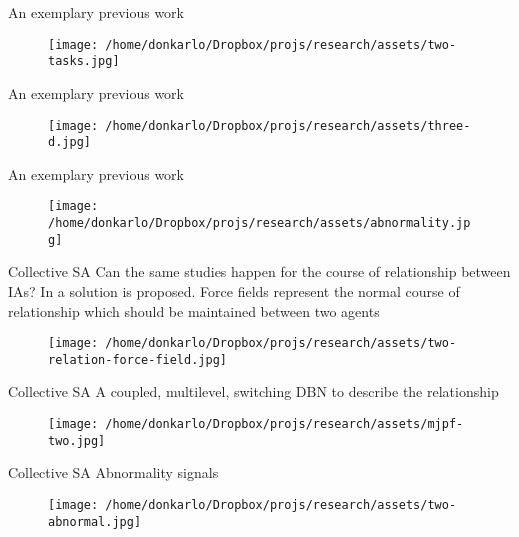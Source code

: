 \documentclass[unknownkeysallowed]{beamer}
\begin{document}
\begin{frame}{An exemplary previous work}
	\begin{figure}
		\texttt{[image: /home/donkarlo/Dropbox/projs/research/assets/two-tasks.jpg]}
		\caption{}
	\end{figure}
\end{frame}

\begin{frame}{An exemplary previous work}
	\begin{figure}
		\texttt{[image: /home/donkarlo/Dropbox/projs/research/assets/three-d.jpg]}
		\caption{}
	\end{figure}
\end{frame}

\begin{frame}{An exemplary previous work}
	\begin{figure}
		\texttt{[image: /home/donkarlo/Dropbox/projs/research/assets/abnormality.jpg]}
		\caption{}
	\end{figure}
\end{frame}

\begin{frame}{Collective SA}
	Can the same studies happen for the course of relationship between IAs?
	In  a solution is proposed. 
	Force fields represent the normal course of relationship which should be maintained between two agents
	\begin{figure}
		\texttt{[image: /home/donkarlo/Dropbox/projs/research/assets/two-relation-force-field.jpg]}
		\caption{}
	\end{figure}
\end{frame}

\begin{frame}{Collective SA}
	A coupled, multilevel, switching DBN to describe the relationship 
	\begin{figure}
		\texttt{[image: /home/donkarlo/Dropbox/projs/research/assets/mjpf-two.jpg]}
		\caption{}
	\end{figure}
\end{frame}

\begin{frame}{Collective SA}
	Abnormality signals
	\begin{figure}
		\texttt{[image: /home/donkarlo/Dropbox/projs/research/assets/two-abnormal.jpg]}
		\caption{}
	\end{figure}
\end{frame}
\end{document}
